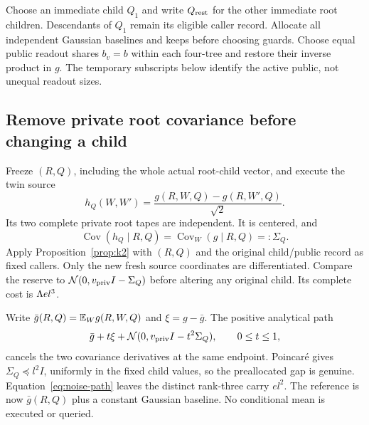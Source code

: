 \documentclass[11pt]{article}
\numberwithin{equation}{section}
\theoremstyle{remark}\newtheorem{remark}[theorem]{Remark}
\newcommand{\N}{\mathcal N}\newcommand{\Cov}{\operatorname{Cov}}
\begin{document}
Choose an immediate child $Q_1$ and write $Q_{\rm rest}$ for the other immediate root children. Descendants of $Q_1$ remain its eligible caller record. Allocate all independent Gaussian baselines and keeps before choosing guards. Choose equal public readout shares $b_v=b$ within each four-tree and restore their inverse product in $g$. The temporary subscripts below identify the active public, not unequal readout sizes.

\subsection{Remove private root covariance before changing a child}
Freeze $(R,Q)$, including the whole actual root-child vector, and execute the twin source
\begin{equation}\label{eq:hQ}
 h_Q(W,W')=\frac{g(R,W,Q)-g(R,W',Q)}{\sqrt2}.
\end{equation}
Its two complete private root tapes are independent. It is centered, and
\[
 \Cov(h_Q\mid R,Q)=\Cov_W(g\mid R,Q)=:\Sigma_Q.
\]
Apply Proposition~\ref{prop:k2} with $(R,Q)$ and the original child/public record as fixed callers. Only the new fresh source coordinates are differentiated. Compare the reserve to $\N(0,v_{\rm priv}I-\Sigma_Q)$ before altering any original child. Its complete cost is $\Lambda el^3$.

Write $\bar g(R,Q)=\mathbb E_Wg(R,W,Q)$ and $\xi=g-\bar g$. The positive analytical path
\begin{equation}\label{eq:common-private}
 \bar g+t\xi+\N(0,v_{\rm priv}I-t^2\Sigma_Q),
 \qquad 0\le t\le1,
\end{equation}
cancels the two covariance derivatives at the same endpoint. Poincar\'e gives $\Sigma_Q\preceq l^2I$, uniformly in the fixed child values, so the preallocated gap is genuine. Equation~\eqref{eq:noise-path} leaves the distinct rank-three carry $el^2$. The reference is now $\bar g(R,Q)$ plus a constant Gaussian baseline. No conditional mean is executed or queried.
\end{document}
